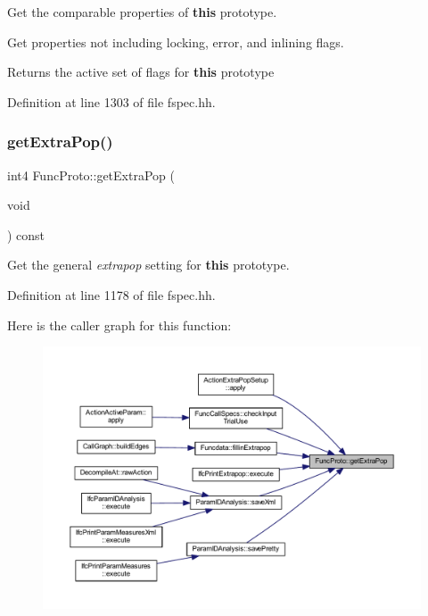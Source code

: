Get the comparable properties of {\bfseries{this}} prototype. 

Get properties not including locking, error, and inlining flags. \begin{DoxyReturn}{Returns}
the active set of flags for {\bfseries{this}} prototype 
\end{DoxyReturn}


Definition at line 1303 of file fspec.\+hh.

\mbox{\label{class_func_proto_a256f0d04256e214c44b653501514c3e0}} 
\subsubsection{\texorpdfstring{getExtraPop()}{getExtraPop()}}
{\footnotesize\ttfamily int4 Func\+Proto\+::get\+Extra\+Pop (\begin{DoxyParamCaption}\item[{void}]{ }\end{DoxyParamCaption}) const\hspace{0.3cm}{\ttfamily [inline]}}



Get the general {\itshape extrapop} setting for {\bfseries{this}} prototype. 



Definition at line 1178 of file fspec.\+hh.

Here is the caller graph for this function\+:
\nopagebreak
\begin{figure}[H]
\begin{center}
\leavevmode
\includegraphics[width=350pt]{class_func_proto_a256f0d04256e214c44b653501514c3e0_icgraph}
\end{center}
\end{figure}
\mbox{\label{class_func_proto_a88af8e37c1ddb25fd9d6d8322ec436c6}} 
